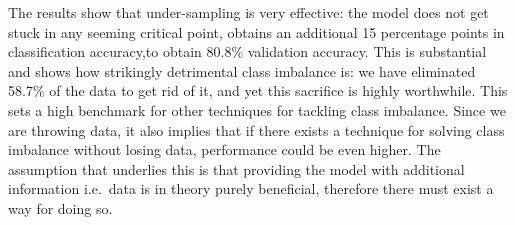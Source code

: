 \documentclass[a4paper,11pt]{article}
\begin{document}
The results show that under-sampling is very effective: the model does not get stuck in any seeming critical point, obtains an additional 15 percentage points in classification accuracy,to obtain 80.8\% validation accuracy. This is substantial and shows how strikingly detrimental class imbalance is: we have eliminated 58.7\% of the data to get rid of it, and yet this sacrifice is highly worthwhile. This sets a high benchmark for other techniques for tackling class imbalance. Since we are throwing data, it also implies that if there exists a technique for solving class imbalance without losing data, performance could be even higher. The assumption that underlies this is that providing the model with additional information i.e.\ data is in theory purely beneficial, therefore there must exist a way for doing so.



%
%
%
%
%
\end{document}
